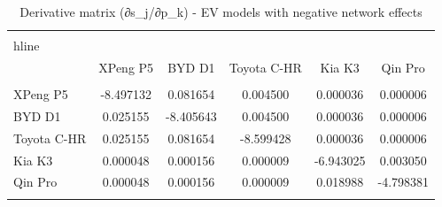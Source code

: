 \begin{table}[!htbp]
\centering
\begin{tabular}{@{\extracolsep{5pt}}lccccc}
\\[-1.8ex]\hline
\\hline \\[-1.8ex]
& XPeng P5 & BYD D1 & Toyota C-HR & Kia K3 & Qin Pro \\
\hline \\[-1.8ex]
XPeng P5 & -8.497132 & 0.081654 & 0.004500 & 0.000036 & 0.000006 \\
BYD D1 & 0.025155 & -8.405643 & 0.004500 & 0.000036 & 0.000006 \\
Toyota C-HR & 0.025155 & 0.081654 & -8.599428 & 0.000036 & 0.000006 \\
Kia K3 & 0.000048 & 0.000156 & 0.000009 & -6.943025 & 0.003050 \\
Qin Pro & 0.000048 & 0.000156 & 0.000009 & 0.018988 & -4.798381 \\
\hline \\[-1.8ex]
\end{tabular}
\caption{Derivative matrix (∂s_j/∂p_k) - EV models with negative network effects}
\end{table}
